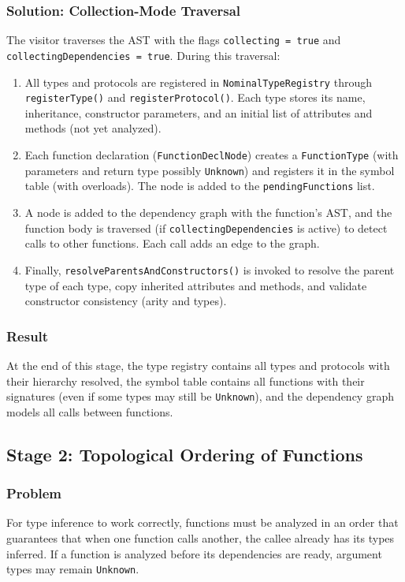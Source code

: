 \documentclass[12pt,a4paper]{report}
\begin{document}
\subsubsection{Solution: Collection-Mode Traversal}

The visitor traverses the AST with the flags \texttt{collecting = true} and \texttt{collectingDependencies = true}.
During this traversal:

\begin{enumerate}
    \item All types and protocols are registered in \texttt{NominalTypeRegistry} through \texttt{registerType()} and \texttt{registerProtocol()}.
    Each type stores its name, inheritance, constructor parameters, and an initial list of attributes and methods (not yet analyzed).
    \item Each function declaration (\texttt{FunctionDeclNode}) creates a \texttt{FunctionType} (with parameters and return type possibly \texttt{Unknown}) and registers it in the symbol table (with overloads).
    The node is added to the \texttt{pendingFunctions} list.
    \item A node is added to the dependency graph with the function's AST, and the function body is traversed (if \texttt{collectingDependencies} is active) to detect calls to other functions.
    Each call adds an edge to the graph.
    \item Finally, \texttt{resolveParentsAndConstructors()} is invoked to resolve the parent type of each type, copy inherited attributes and methods, and validate constructor consistency (arity and types).
\end{enumerate}

\subsubsection{Result}
At the end of this stage, the type registry contains all types and protocols with their hierarchy resolved, the symbol table contains all functions with their signatures (even if some types may still be \texttt{Unknown}), and the dependency graph models all calls between functions.

\subsection{Stage 2: Topological Ordering of Functions}

\subsubsection{Problem}
For type inference to work correctly, functions must be analyzed in an order that guarantees that when one function calls another, the callee already has its types inferred.
If a function is analyzed before its dependencies are ready, argument types may remain \texttt{Unknown}.
\end{document}
